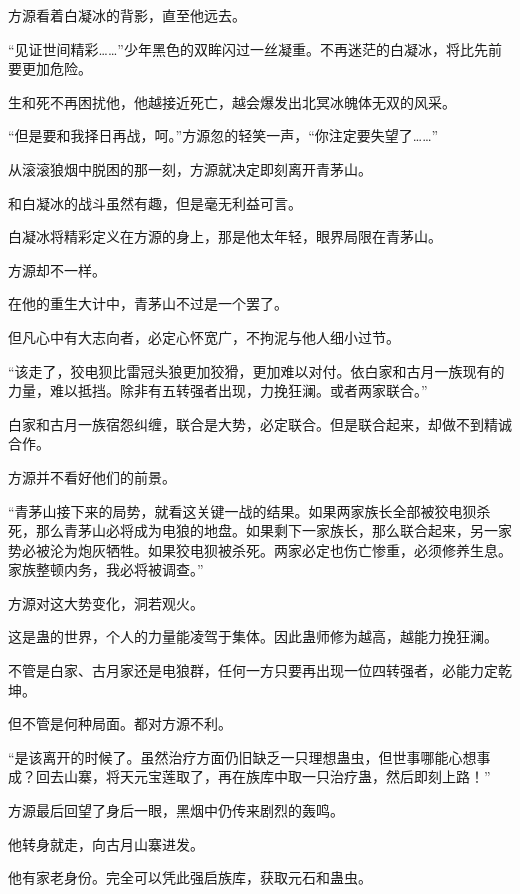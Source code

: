
\begin{this_body}

方源看着白凝冰的背影，直至他远去。

“见证世间精彩……”少年黑色的双眸闪过一丝凝重。不再迷茫的白凝冰，将比先前要更加危险。

生和死不再困扰他，他越接近死亡，越会爆发出北冥冰魄体无双的风采。

“但是要和我择日再战，呵。”方源忽的轻笑一声，“你注定要失望了……”

从滚滚狼烟中脱困的那一刻，方源就决定即刻离开青茅山。

和白凝冰的战斗虽然有趣，但是毫无利益可言。

白凝冰将精彩定义在方源的身上，那是他太年轻，眼界局限在青茅山。

方源却不一样。

在他的重生大计中，青茅山不过是一个罢了。

但凡心中有大志向者，必定心怀宽广，不拘泥与他人细小过节。

“该走了，狡电狈比雷冠头狼更加狡猾，更加难以对付。依白家和古月一族现有的力量，难以抵挡。除非有五转强者出现，力挽狂澜。或者两家联合。”

白家和古月一族宿怨纠缠，联合是大势，必定联合。但是联合起来，却做不到精诚合作。

方源并不看好他们的前景。

“青茅山接下来的局势，就看这关键一战的结果。如果两家族长全部被狡电狈杀死，那么青茅山必将成为电狼的地盘。如果剩下一家族长，那么联合起来，另一家势必被沦为炮灰牺牲。如果狡电狈被杀死。两家必定也伤亡惨重，必须修养生息。家族整顿内务，我必将被调查。”

方源对这大势变化，洞若观火。

这是蛊的世界，个人的力量能凌驾于集体。因此蛊师修为越高，越能力挽狂澜。

不管是白家、古月家还是电狼群，任何一方只要再出现一位四转强者，必能力定乾坤。

但不管是何种局面。都对方源不利。

“是该离开的时候了。虽然治疗方面仍旧缺乏一只理想蛊虫，但世事哪能心想事成？回去山寨，将天元宝莲取了，再在族库中取一只治疗蛊，然后即刻上路！”

方源最后回望了身后一眼，黑烟中仍传来剧烈的轰鸣。

他转身就走，向古月山寨进发。

他有家老身份。完全可以凭此强启族库，获取元石和蛊虫。


\end{this_body}
